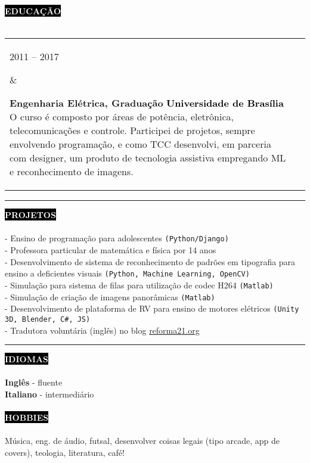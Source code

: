 \documentclass[10pt,A4]{article}
\makeatletter
\newcounter{a}
\newcounter{b}
\newcounter{c}
\newcommand{\cvsection}[1] {
	\textcolor{white}{\MakeUppercase{\textbf{#1}}}
}
\newcommand{\cvsect}[1]{
	\colorbox{black}{{\cvsection{#1}}}\\\\%
}
\newenvironment{entrylist}{%
	\begin{tabular*}{\textwidth}[t]{@{\extracolsep{\fill}}ll}
	}{%
	\end{tabular*}
}
\newcommand{\entry}[4]{%
	\parbox[t]{3.5cm}{%
		#1%
	}%
	&\parbox[t]{14cm}{%
		\textbf{#2}%
		\hfill%
		{\footnotesize \textbf{\textcolor{black}{#3}}}\\%
		#4%
	}\\\\}
\makeatother
\begin{document}
	\cvsect{Educação}
	\begin{entrylist}
		\entry
		{2011 – 2017}
		{Engenharia Elétrica, Graduação}
		{Universidade de Brasília}
		{O curso é composto por áreas de potência, eletrônica, telecomunicações e controle. Participei de projetos, sempre envolvendo programação, e como TCC desenvolvi, em parceria com designer, um produto de tecnologia assistiva empregando ML e reconhecimento de imagens.}
		\entry
		{2014 - 2015}
		{Ciência sem Fronteiras UK, Graduação Sanduíche}
		{Brunel University London}
		{O programa teve duração de 15 meses, no qual participei de curso intensivo de inglês acadêmico, projeto acadêmico de verão em processamento de vídeo (Matlab) e um ano do curso de graduação em engenharia elétrica e eletrônica, com ênfase em processamento de sinais digitais.}
	\end{entrylist}

	\begin{minipage}[t]{0.7\textwidth}\hrule height 0pt width 0pt%
		\cvsect{Projetos}
		- Ensino de programação para adolescentes \texttt{(Python/Django)}\\
		- Professora particular de matemática e física por 14 anos\\
		- Desenvolvimento de sistema de reconhecimento de padrões em tipografia para ensino a deficientes visuais \texttt{(Python, Machine Learning, OpenCV)}\\
		- Simulação para sistema de filas para utilização de codec H264 \texttt{(Matlab)}\\
		- Simulação de criação de imagens panorâmicas \texttt{(Matlab)}\\
		- Desenvolvimento de plataforma de RV para ensino de motores elétricos \texttt{(Unity 3D, Blender, C\#, JS)}\\
		- Tradutora voluntária (inglês) no blog {\href{https://reforma21.org/}{reforma21.org}}
	\end{minipage}%
	\hspace{1cm}
	\begin{minipage}[t]{0.27\textwidth}\hrule height 0pt width 0pt%
		\cvsect{Idiomas}
		\textbf{Inglês} - fluente\\
		\textbf{Italiano} - intermediário\\\\
		\cvsect{Hobbies}
		Música, eng. de áudio, futsal, desenvolver coisas legais (tipo arcade, app de covers), teologia, literatura, café!
	\end{minipage}%
\end{document}
